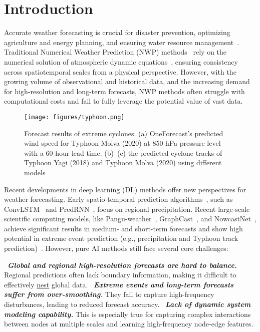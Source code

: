\section{Introduction}
Accurate weather forecasting is crucial for disaster prevention, optimizing agriculture and energy planning, and ensuring water resource management~\cite{chen2023fengwu,pathak2022fourcastnet,ahmed2021improved}. Traditional Numerical Weather Prediction (NWP) methods~\cite{bauer2015quiet} rely on the numerical solution of atmospheric dynamic equations~\cite{achatz2023multiscale,buzzicotti2023spatio}, ensuring consistency across spatiotemporal scales from a physical perspective. However, with the growing volume of observational and historical data, and the increasing demand for high-resolution and long-term forecasts, NWP methods often struggle with computational costs and fail to fully leverage the potential value of vast data.

\begin{figure}[t]
  \centering
\texttt{[image: figures/typhoon.png]}
\vspace{-10pt}
\caption{Forecast results of extreme cyclones.  (a) OneForecast's predicted wind speed for Typhoon Molva (2020) at 850 hPa pressure level with a 60-hour lead time. (b)–(c) the predicted cyclone tracks of Typhoon Yagi (2018) and Typhoon Molva (2020) using different models}
  \label{fig:icml_intro}
\vspace{-15pt}
\end{figure}

Recent developments in deep learning (DL) methods offer new perspectives for weather forecasting. Early spatio-temporal prediction algorithms~\cite{wu2024earthfarsser}, such as ConvLSTM~\cite{10.5555/2969239.2969329} and PredRNN~\cite{wang2022predrnn}, focus on regional precipitation. Recent large-scale scientific computing models, like Pangu-weather~\cite{bi2023accurate}, GraphCast~\cite{lam2023learning}, and NowcastNet~\cite{zhang2023skilful}, achieve significant results in medium- and short-term forecasts and show high potential in extreme event prediction (e.g., precipitation and Typhoon track prediction)~\cite{chen2024machine, espeholt2022deep,gong2024cascast, wu2024neural}. However, pure AI methods still face several core challenges:

~\textbf{\textit{Global and regional high-resolution forecasts are hard to balance.}} Regional predictions often lack boundary information, making it difficult to effectively \underline{nest} global data. ~\textbf{\textit{Extreme events and long-term forecasts suffer from over-smoothing.}} They fail to capture high-frequency disturbances, leading to reduced forecast accuracy. ~\textbf{\textit{Lack of dynamic system modeling capability.}} This is especially true for capturing complex interactions between nodes at multiple scales and learning high-frequency node-edge features.

